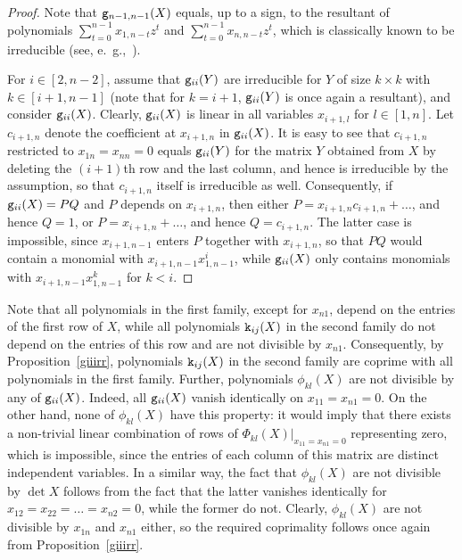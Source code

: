 \documentclass{amsart}
\theoremstyle{definition}
\theoremstyle{remark}
\numberwithin{equation}{section}
\numberwithin{theorem}{section}
\def\eg{{\tt g}}
\def\ek{{\tt k}}
\begin{document}
\begin{proof} Note that $\eg_{n-1,n-1}(X)$ equals, up to a sign, to the resultant of polynomials 
$\sum_{t=0}^{n-1}x_{1,n-t}z^t$ and $\sum_{t=0}^{n-1}x_{n,n-t}z^t$, which is classically known to be irreducible 
(see, e.~g.,~\cite[Ch.~5.9]{VdW}).

For $i\in [2,n-2]$, assume that $\eg_{ii}(Y)$ are irreducible for $Y$ of size $k\times k$ with $k\in[i+1,n-1]$ (note that for $k=i+1$, $\eg_{ii}(Y)$ is once again a resultant), and consider $\eg_{ii}(X)$. Clearly,
$\eg_{ii}(X)$ is linear in all variables $x_{i+1,l}$ for $l\in[1,n]$. Let $c_{i+1,n}$ denote the coefficient at $x_{i+1,n}$ in $\eg_{ii}(X)$. It is easy to see that $c_{i+1,n}$ restricted to $x_{1n}=x_{nn}=0$ equals
$\eg_{ii}(Y)$ for the matrix $Y$ obtained from $X$ by deleting the $(i+1)$th row and the last column, and hence is irreducible by the assumption, so that $c_{i+1,n}$ itself is irreducible as well. Consequently, if $\eg_{ii}(X)=PQ$ and $P$ depends on $x_{i+1,n}$, then either $P=x_{i+1,n}c_{i+1,n}+\dots$, and hence $Q=1$, or $P=x_{i+1,n}+\dots$, and hence $Q=c_{i+1,n}$. The latter case is impossible, since $x_{i+1,n-1}$ enters $P$ together with $x_{i+1,n}$, so that $PQ$ would contain a monomial with $x_{i+1,n-1}x_{1,n-1}^i$, while $\eg_{ii}(X)$ only contains monomials with
$x_{i+1,n-1}x_{1,n-1}^k$ for $k<i$.
\end{proof}

Note that all polynomials in the first family, except for $x_{n1}$, depend on the entries of the first row of $X$, while all polynomials $\ek_{ij}(X)$ in the second family do not depend on the entries of this row and are not divisible by $x_{n1}$. Consequently, by Proposition~\ref{giiirr}, polynomials $\ek_{ij}(X)$ in the second family are coprime with all polynomials in the first family. Further, polynomials $\phi_{kl}(X)$ are not divisible by any of
$\eg_{ii}(X)$. Indeed, all $\eg_{ii}(X)$ vanish identically on $x_{11}=x_{n1}=0$. On the other hand, none of 
$\phi_{kl}(X)$ have this property: it would imply that there exists a non-trivial linear combination of rows of
$\left.\Phi_{kl}(X)\right|_{x_{11}=x_{n1}=0}$ representing zero, which is impossible, since the entries of each column of this matrix are distinct independent variables. In a similar way, the fact that $\phi_{kl}(X)$ are not divisible
by $\det X$ follows from the fact that the latter vanishes identically for $x_{12}=x_{22}=\dots=x_{n2}=0$, while the former do not. Clearly, $\phi_{kl}(X)$ are not divisible by $x_{1n}$ and $x_{n1}$ either, so the required coprimality 
follows once again from Proposition~\ref{giiirr}.
\end{document}
